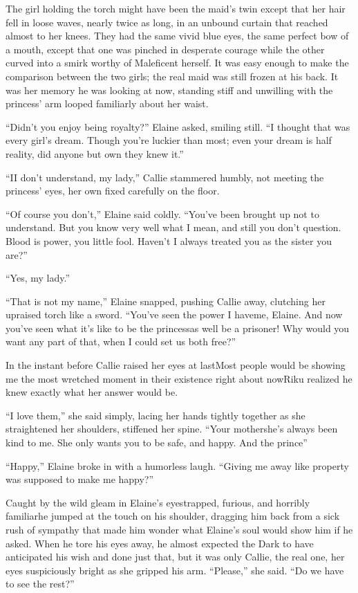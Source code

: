 The girl holding the torch might have been the maid's twin except that her hair fell in loose waves, nearly twice as long, in an unbound curtain that reached almost to her knees. They had the same vivid blue eyes, the same perfect bow of a mouth, except that one was pinched in desperate courage while the other curved into a smirk worthy of Maleficent herself. It was easy enough to make the comparison between the two girls; the real maid was still frozen at his back. It was her memory he was looking at now, standing stiff and unwilling with the princess' arm looped familiarly about her waist.

``Didn't you enjoy being royalty?'' Elaine asked, smiling still. ``I thought that was every girl's dream. Though you're luckier than most; even your dream is half reality, did anyone but own they knew it.''

``I\textemdash I don't understand, my lady,'' Callie stammered humbly, not meeting the princess' eyes, her own fixed carefully on the floor.

``Of course you don't,'' Elaine said coldly. ``You've been brought up not to understand. But you know very well what I mean, and still you don't question. Blood is power, you little fool. Haven't I always treated you as the sister you are?''

``Yes, my lady.''

``That is not my name,'' Elaine snapped, pushing Callie away, clutching her upraised torch like a sword. ``You've seen the power I have\textemdash me, Elaine. And now you've seen what it's like to be the princess\textemdash as well be a prisoner! Why would you want any part of that, when I could set us both free?''

In the instant before Callie raised her eyes at last\textemdash Most people would be showing me the most wretched moment in their existence right about now\textemdash Riku realized he knew exactly what her answer would be.

``I love them,'' she said simply, lacing her hands tightly together as she straightened her shoulders, stiffened her spine. ``Your mother\textemdash she's always been kind to me. She only wants you to be safe, and happy. And the prince\textemdash ''

``Happy,'' Elaine broke in with a humorless laugh. ``Giving me away like property was supposed to make me happy?''

Caught by the wild gleam in Elaine's eyes\textemdash trapped, furious, and horribly familiar\textemdash he jumped at the touch on his shoulder, dragging him back from a sick rush of sympathy that made him wonder what Elaine's soul would show him if he asked. When he tore his eyes away, he almost expected the Dark to have anticipated his wish and done just that, but it was only Callie, the real one, her eyes suspiciously bright as she gripped his arm. ``Please,'' she said. ``Do we have to see the rest?''

